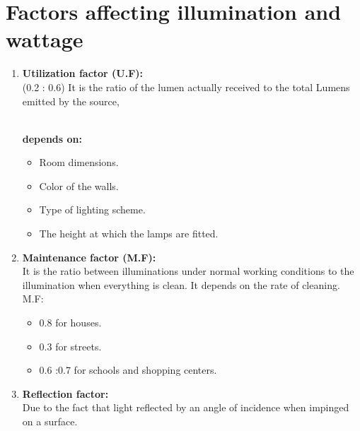 \documentclass[12pt,fleqn]{book} %
\begin{document}
 \section{Factors affecting illumination and wattage}
 \begin{enumerate}
 \item \textbf {Utilization factor (U.F):}
\\(0.2 : 0.6) It is the ratio of the lumen actually received to the total Lumens emitted by the source, 

\\ \textbf {depends on:}  
\begin {itemize}
\item  {Room dimensions.}
\item  {Color of the walls.}
\item  {Type of lighting scheme.}
\item  {The height at which the lamps are fitted.}
\end {itemize}

\item \textbf {Maintenance factor (M.F):}
\\It is the ratio between illuminations under normal working conditions to the illumination when everything is clean. It depends on the rate of cleaning. M.F:
\begin {itemize}
\item  {0.8 for houses.}
\item  {0.3 for streets.}
\item  {0.6 :0.7 for schools and shopping centers.}
\end {itemize}

\item \textbf {Reflection factor:}
\\Due to the fact that light reflected by an angle of incidence when impinged on a surface.
 \end{enumerate}
\end{document}
